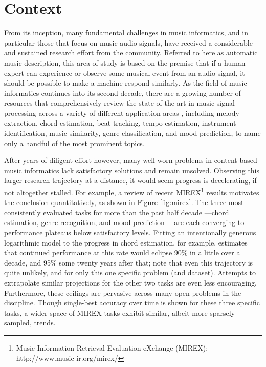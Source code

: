

\graphicspath{{2/figures/}}

\chapter{Context}
\label{chp:context}


From its inception, many fundamental challenges in music informatics, and in particular those that focus on music audio signals, have received a considerable and sustained research effort from the community.
Referred to here as automatic music description, this area of study is based on the premise that if a human expert can experience or observe some musical event from an audio signal, it should be possible to make a machine respond similarly.
As the field of music informatics continues into its second decade, there are a growing number of resources that comprehensively review the state of the art in music signal processing across a variety of different application areas \cite{Klapuri2006Signal,Casey2008Content,Mueller2011Signal}, including melody extraction, chord estimation, beat tracking, tempo estimation, instrument identification, music similarity, genre classification, and mood prediction, to name only a handful of the most prominent topics.

After years of diligent effort however, many well-worn problems in content-based music informatics lack satisfactory solutions and remain unsolved.
Observing this larger research trajectory at a distance, it would seem progress is decelerating, if not altogether stalled.
For example, a review of recent MIREX\footnote{Music Information Retrieval Evaluation eXchange (MIREX): {http://www.music-ir.org/mirex/}} results motivates the conclusion quantitatively, as shown in Figure \ref{fig:mirex}.
The three most consistently evaluated tasks for more than the past half decade ---chord estimation, genre recognition, and mood prediction--- are each converging to performance plateaus below satisfactory levels.
Fitting an intentionally generous logarithmic model to the progress in chord estimation, for example, estimates that continued performance at this rate would eclipse 90\% in a little over a decade, and 95\% some twenty years after that; note that even this trajectory is quite unlikely, and for only this one specific problem (and dataset).
Attempts to extrapolate similar projections for the other two tasks are even less encouraging.
Furthermore, these ceilings are pervasive across many open problems in the discipline.
Though single-best accuracy over time is shown for these three specific tasks, a wider space of MIREX tasks exhibit similar, albeit more sparsely sampled, trends.

